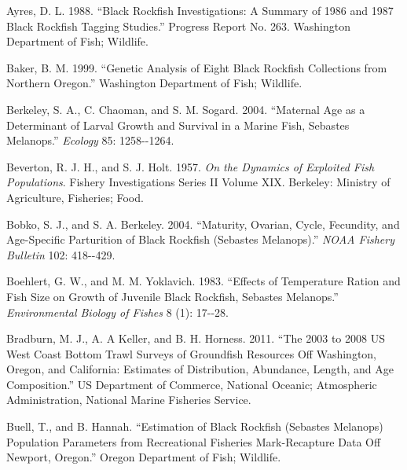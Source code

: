 \documentclass[11pt,
  english,
  letterpaper,
]{article}
\newlength{\cslhangindent}
\newenvironment{CSLReferences}[2] %
 {%
  \setlength{\parindent}{0pt}
  \ifodd #1 \everypar{\setlength{\hangindent}{\cslhangindent}}\ignorespaces\fi
  \ifnum #2 > 0
  \setlength{\parskip}{#2\baselineskip}
  \fi
 }%
 {}
\begin{document}
\hypertarget{refs}{}
\begin{CSLReferences}{1}{0}
\leavevmode{}%
Ayres, D. L. 1988. {``Black Rockfish Investigations: A Summary of 1986 and 1987 Black Rockfish Tagging Studies.''} Progress Report No. 263. Washington Department of Fish; Wildlife.

\leavevmode{}%
Baker, B. M. 1999. {``Genetic Analysis of Eight Black Rockfish Collections from Northern Oregon.''} Washington Department of Fish; Wildlife.

\leavevmode{}%
Berkeley, S. A., C. Chaoman, and S. M. Sogard. 2004. {``Maternal Age as a Determinant of Larval Growth and Survival in a Marine Fish, Sebastes Melanops.''} \emph{Ecology} 85: 1258-\/-1264.

\leavevmode{}%
Beverton, R. J. H., and S. J. Holt. 1957. \emph{On the Dynamics of Exploited Fish Populations}. Fishery {Investigations} {Series II} {Volume XIX}. Berkeley: Ministry of Agriculture, Fisheries; Food.

\leavevmode{}%
Bobko, S. J., and S. A. Berkeley. 2004. {``Maturity, Ovarian, Cycle, Fecundity, and Age-Specific Parturition of Black Rockfish (Sebastes Melanops).''} \emph{NOAA Fishery Bulletin} 102: 418-\/-429.

\leavevmode{}%
Boehlert, G. W., and M. M. Yoklavich. 1983. {``Effects of Temperature Ration and Fish Size on Growth of Juvenile Black Rockfish, Sebastes Melanops.''} \emph{Environmental Biology of Fishes} 8 (1): 17-\/-28.

\leavevmode{}%
Bradburn, M. J., A. A Keller, and B. H. Horness. 2011. {``The 2003 to 2008 {US} {West} {Coast} Bottom Trawl Surveys of Groundfish Resources Off {Washington}, {Oregon}, and {California}: Estimates of Distribution, Abundance, Length, and Age Composition.''} US Department of Commerce, National Oceanic; Atmospheric Administration, National Marine Fisheries Service.

\leavevmode{}%
Buell, T., and B. Hannah. {``Estimation of Black Rockfish (Sebastes Melanops) Population Parameters from Recreational Fisheries Mark-Recapture Data Off Newport, Oregon.''} Oregon Department of Fish; Wildlife.


\end{CSLReferences}
\end{document}

